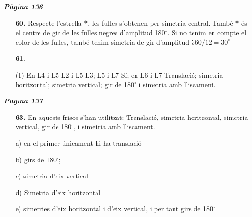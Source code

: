 \documentclass[a4paper, pdf, twoside]{book}
\begin{document}
\begin{multicols}{2}

{\textbf{\em Pàgina 136}} \hrulefill
\begin{enumerate}
\vspace{0.25cm}
\item[\fontfamily{phv}\selectfont\color{blue}\textbf{60. }] 
Respecte l'estrella \textbf {*}, les fulles s'obtenen per simetria central. També \textbf {*} és el centre de gir de les fulles negres d'amplitud 180$^\circ $. Si no tenim en compte el color de les fulles, també tenim simetria de gir d'amplitud $360/12=30^\circ $
 \end{enumerate}
\begin{enumerate}
\vspace{0.25cm}



 \item[\fontfamily{phv}\selectfont\color{blue}\textbf{61}. ] 
 \begin{tasks}[column-sep=1em, item-indent=1.3333em](1)
	 \task  En L4 i L5
	 \task L2 i L5
	 \task L3; L5 i L7
	 \task Sí; en L6 i L7
	 \task* Translació; simetria horitzontal; simetria vertical; gir de 180$^\circ $ i simetria amb lliscament.
\end{tasks}
 \end{enumerate}
\vspace{0.3cm}


{\textbf{\em Pàgina 137}} \hrulefill
\begin{enumerate}
\vspace{0.25cm}
\item[\fontfamily{phv}\selectfont\color{blue}\textbf{63. }] 
En aquests frisos s'han utilitzat: Translació, simetria horitzontal, simetria vertical, gir de 180$^\circ $, i simetria amb lliscament.\par a) en el primer únicament hi ha translació \par b) girs de 180$^\circ $; \par c) simetria d'eix vertical\par d) Simetria d'eix horitzontal \par e) simetries d'eix horitzontal i d'eix vertical, i per tant girs de 180$^\circ $
 \end{enumerate}
\begin{enumerate}
\vspace{0.25cm}




\end{enumerate}
\end{multicols}
\end{document}
